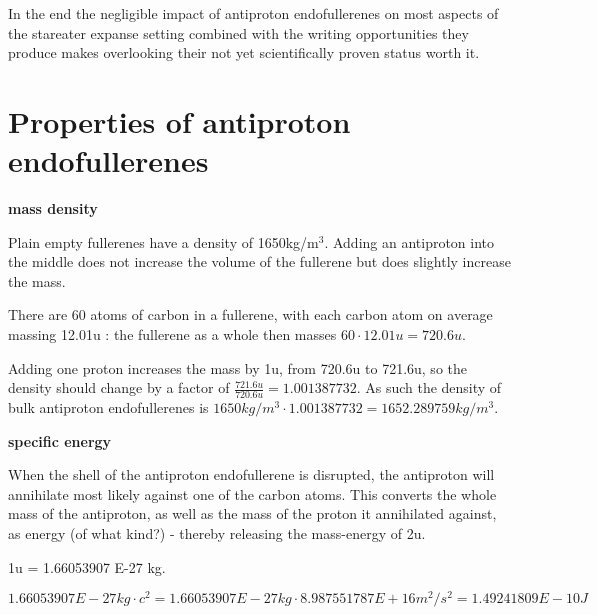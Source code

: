 \documentclass[a4paper]{article}
\begin{document}
	\medskip
	
	In the end the negligible impact of antiproton endofullerenes on most aspects of the stareater expanse setting combined with the writing opportunities they produce makes overlooking their not yet scientifically proven status worth it.
	
	\bigskip
	\pagebreak
	
	\section{Properties of antiproton endofullerenes}
	
	\begin{center}
		\textbf{mass density}
	\end{center}
	
    Plain empty fullerenes have a density of 1650kg/m$^3$.
    Adding an antiproton into the middle does not increase the volume of the fullerene but does slightly increase the mass.
    
    \medskip
    
    There are 60 atoms of carbon in a fullerene, with each carbon atom on average massing 12.01u : the fullerene as a whole then masses $60\cdot12.01u = 720.6u$.
    
    \medskip
    
    Adding one proton increases the mass by 1u, from 720.6u to 721.6u, so the density should change by a factor of $\frac{721.6u}{720.6u} = 1.001387732$.
    As such the density of bulk antiproton endofullerenes is $1650kg/m^3 \cdot 1.001387732 = 1652.289759 kg/m^3$.
    
    \begin{center}
    	\textbf{specific energy}
    \end{center}
    
    When the shell of the antiproton endofullerene is disrupted, the antiproton will annihilate most likely against one of the carbon atoms. This converts the whole mass of the antiproton, as well as the mass of the proton it annihilated against, as energy (of what kind?) - thereby releasing the mass-energy of 2u.
    
    \medskip
    
    1u = 1.66053907 E-27 kg.
    
    \medskip
    
    $$ 1.66053907 E-27 kg \cdot c^2 = 1.66053907 E-27 kg \cdot 8.987551787 E+16 m^2/s^2 = 1.49241809 E-10 J $$
    
    \medskip
    
\end{document}
